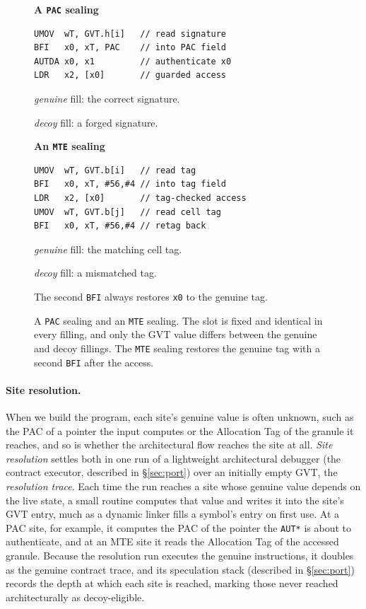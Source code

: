\documentclass[letterpaper,twocolumn,10pt]{article}
\theoremstyle{definition}
\begin{document}
\begin{figure}[t]
\centering
\footnotesize
\begin{minipage}[t]{0.46\linewidth}
\centering\textbf{A \texttt{PAC} sealing}\par\smallskip
\begin{verbatim}
UMOV  wT, GVT.h[i]   // read signature
BFI   x0, xT, PAC    // into PAC field
AUTDA x0, x1         // authenticate x0
LDR   x2, [x0]       // guarded access
\end{verbatim}
\vspace{\baselineskip}
\raggedright\small
\emph{genuine} fill: the correct signature.\par
\emph{decoy} fill: a forged signature.
\end{minipage}\hfill
\begin{minipage}[t]{0.46\linewidth}
\centering\textbf{An \texttt{MTE} sealing}\par\smallskip
\begin{verbatim}
UMOV  wT, GVT.b[i]   // read tag
BFI   x0, xT, #56,#4 // into tag field
LDR   x2, [x0]       // tag-checked access
UMOV  wT, GVT.b[j]   // read cell tag
BFI   x0, xT, #56,#4 // retag back
\end{verbatim}
\raggedright\small
\emph{genuine} fill: the matching cell tag.\par
\emph{decoy} fill: a mismatched tag.\par
The second \texttt{BFI} always restores \texttt{x0} to the genuine tag.
\end{minipage}
\caption{A \texttt{PAC} sealing and an \texttt{MTE} sealing. The slot is fixed and identical
in every filling, and only the GVT value differs between the genuine and decoy fillings.
The \texttt{MTE} sealing restores the genuine tag with a second \texttt{BFI} after the access.}
\label{fig:precond-seal}
\end{figure}

\paragraph{Site resolution.}
When we build the program, each site's genuine value is often unknown, such as the PAC of a
pointer the input computes or the Allocation Tag of the granule it reaches, and so is whether the
architectural flow reaches the site at all. \emph{Site resolution} settles both in one run of a
lightweight architectural debugger (the contract executor, described in \S\ref{sec:port}) over an
initially empty GVT, the \emph{resolution trace}. Each time the run reaches a site whose genuine
value depends on the live state, a small routine computes that value and writes it into the site's
GVT entry, much as a dynamic linker fills a symbol's entry on first use. At a PAC site, for
example, it computes the PAC of the pointer the \texttt{AUT*} is about to authenticate, and at an
MTE site it reads the Allocation Tag of the accessed granule. Because the resolution run executes
the genuine instructions, it doubles as the genuine contract trace, and its speculation stack
(described in \S\ref{sec:port}) records the depth at which each site is reached, marking those
never reached architecturally as decoy-eligible.
\end{document}
